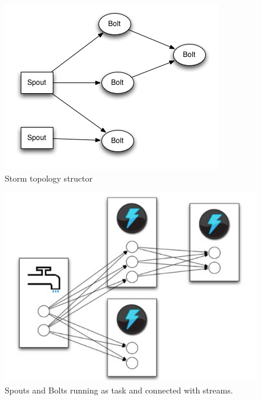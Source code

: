 \documentclass[journal]{IEEEtran/IEEEtran}
\begin{document}
\begin{figure}[htbp]
    \begin{center}
        \includegraphics[scale=0.55]{img/topology.png}
        \caption{Storm topology structor}
        \label{topology}
    \end{center}
\end{figure}

\begin{figure}[htbp]
    \begin{center}
        \includegraphics[scale=0.40]{img/tasks.png}
        \caption{Spouts and Bolts running as task and connected with streams.}
        \label{tasks}
    \end{center}
\end{figure}
\end{document}
